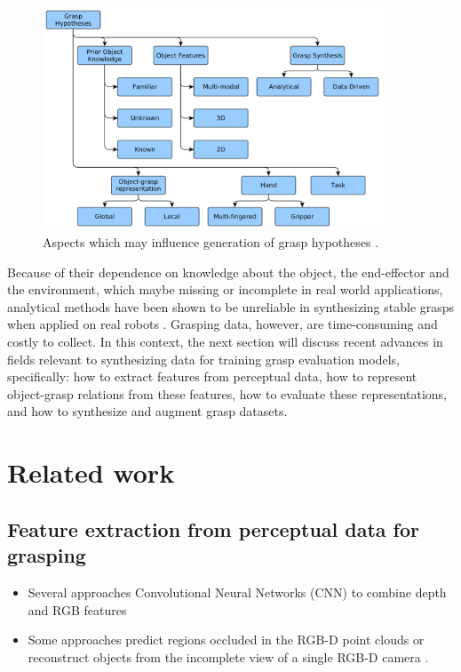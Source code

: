 \documentclass[runningheads]{../llncs}
\begin{document}
\begin{figure}[h!]
    \centering
    \includegraphics[width=0.9\textwidth]{bohg14-grasp_synthesis_mind_map}
    \caption{Aspects which may influence generation of grasp hypotheses \cite{Bohg2014}.}
    \label{fig:grasp_synthesis_mind_map}
\end{figure}

Because of their dependence on knowledge about the object, the end-effector and the environment, which maybe missing
or incomplete in real world applications, analytical methods have been shown to be unreliable in synthesizing stable
grasps when applied on real robots \cite{Kappler2015,Rubert2017,WeiszAllen2012}. Grasping data, however, are
time-consuming and costly to collect. In this context, the next section will discuss recent advances in fields relevant
to synthesizing data for training grasp evaluation models, specifically: how to extract features from perceptual data,
how to represent object-grasp relations from these features, how to evaluate these representations, and how to
synthesize and augment grasp datasets.

\section{Related work}

\subsection*{Feature extraction from perceptual data for grasping}

\begin{itemize}
    \item Several approaches Convolutional Neural Networks (CNN) to combine depth and RGB features
            \cite{Eitel2015,Gupta2014RGBDFeatures,Porzi2017}
    \item Some approaches predict regions occluded in the RGB-D point clouds \cite{Qi2016,Su2015} or reconstruct objects
            from the incomplete view of a single RGB-D camera \cite{Bohg2011MindTheGap,Varley2017}.
\end{itemize}
\end{document}
